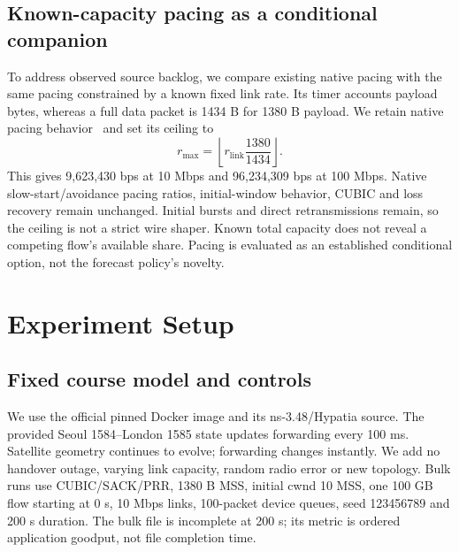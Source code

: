 \documentclass[conference]{IEEEtran}
\begin{document}
\subsection{Known-capacity pacing as a conditional companion}
To address observed source backlog, we compare existing native pacing
with the same pacing constrained by a known fixed link rate. Its timer
accounts payload bytes, whereas a full data packet is 1434 B for 1380 B
payload. We retain native pacing behavior~\cite{ns3} and set its ceiling to
\begin{equation}
 r_{\max}=\left\lfloor r_{\mathrm{link}}\frac{1380}{1434}\right\rfloor.
\end{equation}
This gives 9,623,430 bps at 10 Mbps and 96,234,309 bps at 100 Mbps. Native
slow-start/avoidance pacing ratios, initial-window behavior, CUBIC and
loss recovery remain unchanged. Initial bursts and direct retransmissions
remain, so the ceiling is not a strict wire shaper. Known total capacity
does not reveal a competing flow's available share. Pacing is evaluated
as an established conditional option, not the forecast policy's novelty.

\section{Experiment Setup}
\subsection{Fixed course model and controls}
We use the official pinned Docker image and its ns-3.48/Hypatia source.
The provided Seoul 1584--London 1585 state updates forwarding every 100 ms.
Satellite geometry continues to evolve; forwarding changes instantly.
We add no handover outage, varying link capacity, random radio error or
new topology. Bulk runs use CUBIC/SACK/PRR, 1380 B MSS, initial cwnd 10 MSS,
one 100 GB flow starting at 0 s, 10 Mbps links, 100-packet device queues,
seed 123456789 and 200 s duration. The bulk file is incomplete at 200 s;
its metric is ordered application goodput, not file completion time.
\end{document}

